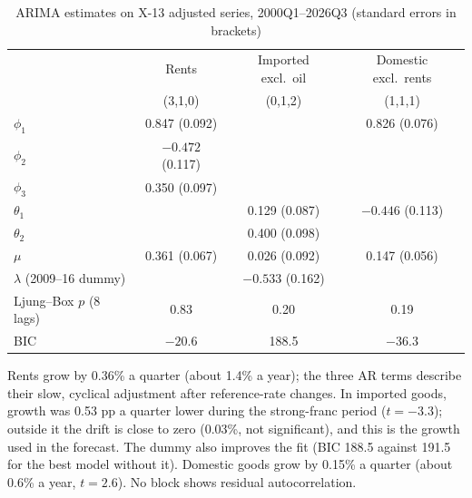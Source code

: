 \documentclass[11pt,a4paper]{article}
\begin{document}
\begin{table}[h]
  \centering\small
  \caption{ARIMA estimates on X-13 adjusted series, 2000Q1--2026Q3 (standard errors in brackets)}\label{tab:arima}
  \begin{tabular}{@{}lccc@{}}
    \toprule
    & Rents & Imported excl.\ oil & Domestic excl.\ rents \\
    & (3,1,0) & (0,1,2) & (1,1,1) \\
    \midrule
    $\phi_1$   & 0.847 (0.092) &                 & 0.826 (0.076) \\
    $\phi_2$   & $-0.472$ (0.117) &              & \\
    $\phi_3$   & 0.350 (0.097) &                 & \\
    $\theta_1$ &               & 0.129 (0.087)   & $-0.446$ (0.113) \\
    $\theta_2$ &               & 0.400 (0.098)   & \\
    $\mu$      & 0.361 (0.067) & 0.026 (0.092)   & 0.147 (0.056) \\
    $\lambda$ (2009--16 dummy) & & $-0.533$ (0.162) & \\
    \midrule
    Ljung--Box $p$ (8 lags) & 0.83 & 0.20 & 0.19 \\
    BIC        & $-20.6$ & 188.5 & $-36.3$ \\
    \bottomrule
  \end{tabular}
\end{table}

Rents grow by 0.36\% a quarter (about 1.4\% a year); the three AR terms describe their slow,
cyclical adjustment after reference-rate changes. In imported goods, growth was 0.53 pp a quarter
lower during the strong-franc period ($t = -3.3$); outside it the drift is close to zero (0.03\%, not
significant), and this is the growth used in the forecast. The dummy also improves the fit (BIC 188.5
against 191.5 for the best model without it). Domestic goods grow by 0.15\% a quarter (about 0.6\% a
year, $t = 2.6$). No block shows residual autocorrelation.
\end{document}
